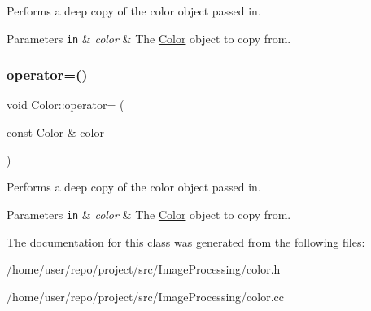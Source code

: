 Performs a deep copy of the color object passed in. 


\begin{DoxyParams}[1]{Parameters}
\mbox{\tt in}  & {\em color} & The \hyperlink{classColor}{Color} object to copy from. \\
\hline
\end{DoxyParams}
\mbox{\label{classColor_ac06dcf409ae64de5a67c7f6e69b6f44b}} 
\subsubsection{\texorpdfstring{operator=()}{operator=()}\hspace{0.1cm}{\footnotesize\ttfamily [2/2]}}
{\footnotesize\ttfamily void Color\+::operator= (\begin{DoxyParamCaption}\item[{const \hyperlink{classColor}{Color} \&}]{color }\end{DoxyParamCaption})}



Performs a deep copy of the color object passed in. 


\begin{DoxyParams}[1]{Parameters}
\mbox{\tt in}  & {\em color} & The \hyperlink{classColor}{Color} object to copy from. \\
\hline
\end{DoxyParams}


The documentation for this class was generated from the following files\+:\begin{DoxyCompactItemize}
\item 
/home/user/repo/project/src/\+Image\+Processing/color.\+h\item 
/home/user/repo/project/src/\+Image\+Processing/color.\+cc\end{DoxyCompactItemize}
